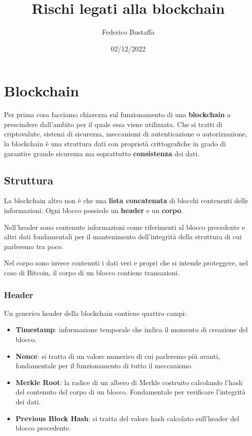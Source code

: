 \documentclass[11pt, a4paper]{article}
\title{Rischi legati alla blockchain}
\author{Federico Bustaffa}
\date{02/12/2022}
\begin{document}
\maketitle
\tableofcontents

\section{Blockchain}
Per prima cosa facciamo chiarezza sul funzionamento di una \textbf{blockchain} a prescindere dall'ambito per il
quale essa viene utilizzata. Che si tratti di criptovalute, sistemi di sicurezza, meccanismi di autenticazione o
autorizzazione, la blockchain è una struttura dati con proprietà crittografiche in grado di garantire grande
sicurezza ma soprattutto \textbf{consistenza} dei dati.

\subsection{Struttura}
La blockchain altro non è che una \textbf{lista concatenata} di blocchi contenenti delle informazioni. Ogni blocco
possiede un \textbf{header} e un \textbf{corpo}.

Nell'header sono contenute informazioni come riferimenti al blocco precedente e altri dati fondamentali per
il mantenimento dell'integrità della struttura di cui parleremo tra poco.

Nel corpo sono invece contenuti i dati veri e propri che si intende proteggere, nel caso di Bitcoin, il corpo di
un blocco contiene transazioni.

\subsubsection{Header}
Un generico header della blockchain contiene quattro campi:
\begin{itemize}
	\item \textbf{Timestamp}: informazione temporale che indica il momento di creazione del blocco.
	\item \textbf{Nonce}: si tratta di un valore numerico di cui parleremo più avanti, fondamentale per il
	      funzionamento di tutto il meccanismo.
	\item \textbf{Merkle Root}: la radice di un albero di Merkle costruito calcolando l'hash del contenuto del
	      corpo di un blocco. Fondamentale per verificare l'integrità dei dati.
	\item \textbf{Previous Block Hash}: si tratta del valore hash calcolato sull'header del blocco precedente.
\end{itemize}
\end{document}

